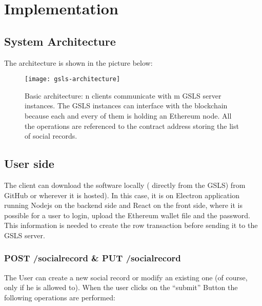 \chapter{Implementation}
\label{implementation}

\section{System Architecture}
The architecture is shown in the picture below: \\

\begin{figure}[h]
	\centering
  \texttt{[image: gsls-architecture]}
	\caption{Basic architecture: n clients communicate with m GSLS server instances. The GSLS instances can interface with the blockchain because each and every of them is holding an Ethereum node. All the operations are referenced to the contract address storing the list of social records.}
	\label{fig1}
\end{figure}

\section{User side}
The client can download the software locally ( directly from the GSLS) from GitHub or wherever it is hosted).
In this case, it is on Electron application running Nodejs on the backend side and React on the front side, where it is possible for a user to login, upload the Ethereum wallet file and the password.
This information is needed to create the row transaction before sending it to the GSLS server.

\subsection{POST /socialrecord \& PUT /socialrecord}
The User can create a new social record or modify an existing one (of course, only if he is allowed to).
When the user clicks on the “submit” Button the following operations are performed:

